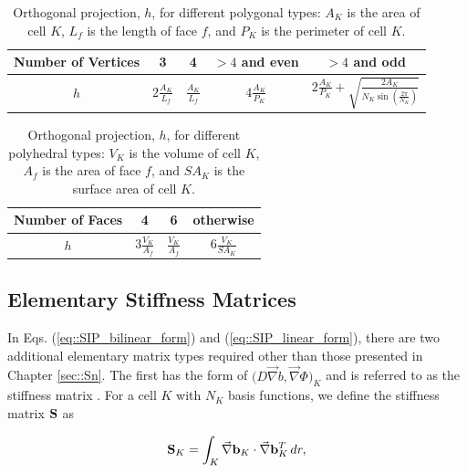 \begin{table}[h]
\centering
\caption{Orthogonal projection, $h$, for different polygonal types: $A_K$ is the area of cell $K$, $L_f$ is the length of face $f$, and $P_K$ is the perimeter of cell $K$.}
\def\arraystretch{1.4}
\begin{tabular}{|c|c|c|c|c|}
	\hline
	Number of Vertices & 3 & 4 & $>4$ and even& $>4$ and odd \\
	\hline
	$h$ & $2 \frac{A_K}{L_f}$ & $\frac{A_K}{L_f}$ & $4 \frac{A_K}{P_K}$ & $2 \frac{A_K}{P_K} + \sqrt{\frac{2 A_K}{N_K \sin(\frac{2 \pi}{N_K})}}$ \\
	\hline
\end{tabular}
\label{tab::orth_proj_2D}
\end{table}

\begin{table}[h]
\centering
\caption{Orthogonal projection, $h$, for different polyhedral types: $V_K$ is the volume of cell $K$, $A_f$ is the area of face $f$, and $SA_K$ is the surface area of cell $K$.}
\def\arraystretch{1.4}
\begin{tabular}{|c|c|c|c|}
	\hline
	Number of Faces & 4 & 6 & otherwise \\
	\hline
	$h$ & $3 \frac{V_K}{A_f}$ & $\frac{V_K}{A_f}$ & $6 \frac{V_K}{SA_K}$  \\ [1ex]
	\hline
\end{tabular}
\label{tab::orth_proj_3D}
\end{table}

\subsection{Elementary Stiffness Matrices}
\label{sec::DSA_SIP_Stiffness}

In Eqs. (\ref{eq::SIP_bilinear_form}) and (\ref{eq::SIP_linear_form}), there are two additional elementary matrix types required other than those presented in Chapter \ref{sec::Sn}. The first has the form of $\Big(  D \vec{\nabla}  b , \vec{\nabla} \Phi  \Big)_{K}$ and is referred to as the stiffness matrix \cite{akin1982application}. For a cell $K$ with $N_K$ basis functions, we define the stiffness matrix ${\bf S}$ as

\begin{equation}
\label{eq::DSA_stiffness_matrix_analytical}
{\bf S}_K =    \int_K \vec{\nabla} {\bf b}_K \cdot \vec{\nabla} {\bf b}_K^T \, d r ,
\end{equation}

